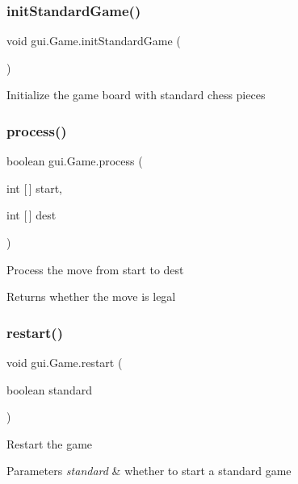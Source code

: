 \subsubsection{\texorpdfstring{init\+Standard\+Game()}{initStandardGame()}}
{\footnotesize\ttfamily void gui.\+Game.\+init\+Standard\+Game (\begin{DoxyParamCaption}{ }\end{DoxyParamCaption})}

Initialize the game board with standard chess pieces \mbox{\label{classgui_1_1_game_a2ad737de5ea0e5ad722f8519ff771617}} 
\subsubsection{\texorpdfstring{process()}{process()}}
{\footnotesize\ttfamily boolean gui.\+Game.\+process (\begin{DoxyParamCaption}\item[{int \mbox{[}$\,$\mbox{]}}]{start,  }\item[{int \mbox{[}$\,$\mbox{]}}]{dest }\end{DoxyParamCaption})}

Process the move from start to dest \begin{DoxyReturn}{Returns}
whether the move is legal 
\end{DoxyReturn}
\mbox{\label{classgui_1_1_game_a674b55155cbba7f976aa95caa017ee3b}} 
\subsubsection{\texorpdfstring{restart()}{restart()}}
{\footnotesize\ttfamily void gui.\+Game.\+restart (\begin{DoxyParamCaption}\item[{boolean}]{standard }\end{DoxyParamCaption})}

Restart the game 
\begin{DoxyParams}{Parameters}
{\em standard} & whether to start a standard game \\
\hline
\end{DoxyParams}
\mbox{\label{classgui_1_1_game_ae988eca0ead138d87285ea93d870385d}} 
